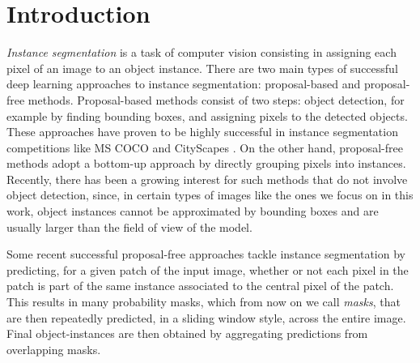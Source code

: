 
\section{Introduction}\label{sec:intro}

\emph{Instance segmentation} is a task of computer vision consisting in assigning each pixel of an image to an object instance. %
There are two main types of successful deep learning approaches to instance segmentation: proposal-based and proposal-free methods. 
Proposal-based methods consist of two steps: object detection, for example by finding bounding boxes, and assigning pixels to the detected objects. These approaches have proven to be highly successful in instance segmentation competitions like MS COCO \cite{lin2014microsoft} and CityScapes \cite{cordts2016cityscapes}. 
On the other hand, proposal-free methods adopt a bottom-up approach by directly grouping pixels into instances. Recently, there has been a growing interest for such methods that do not involve object detection, since, in certain types of images like the ones we focus on in this work, object instances cannot be approximated by bounding boxes and are usually larger than the field of view of the model.  

 
Some recent successful proposal-free approaches \cite{januszewski2018high,meirovitch2016multi,liu2016multi} tackle instance segmentation by predicting, for a given patch of the input image, whether or not each pixel in the patch is part of the same instance associated to the central pixel of the patch. 
This results in many probability masks, which from now on we call \emph{\maskname masks}, that are then repeatedly predicted, in a sliding window style, across the entire image. 
Final object-instances are then obtained by aggregating predictions from overlapping masks.

